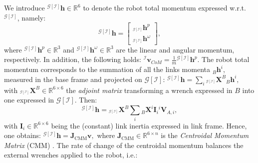 We introduce ${}^{\mathcal{G}[\mathcal{I}]} \boldsymbol{h} \in \mathbb{R}^6$ to denote the robot total momentum expressed w.r.t. ${}^{\mathcal{G}[\mathcal{I}]}$, namely:
\begin{equation}
	{}^{\mathcal{G}[\mathcal{I}]} \boldsymbol{h} = \begin{bmatrix}
		{}_{{}^{\mathcal{G}[\mathcal{I}]}} \boldsymbol{h}^p \\
		{}_{{}^{\mathcal{G}[\mathcal{I}]}} \boldsymbol{h}^\omega
	\end{bmatrix},
\end{equation}
where ${}^{\mathcal{G}[\mathcal{I}]} \boldsymbol{h}^p \in \mathbb{R}^3$ and ${}^{\mathcal{G}[\mathcal{I}]} \boldsymbol{h}^\omega \in \mathbb{R}^3$ are the linear and angular momentum, respectively. In addition, the following holds:
	${}^{\mathcal{I}}\boldsymbol{v}_{CoM}  = \frac{1}{m}{} {{}^{\mathcal{G}[\mathcal{I}]}} \boldsymbol{h}^p.$
The robot total momentum corresponds to the summation of all the links momenta ${}_B\boldsymbol{h}^i$, measured in the base frame and projected on ${\mathcal{G}[\mathcal{I}]}$:
	${}^{\mathcal{G}[\mathcal{I}]}\boldsymbol{h} = \sum_i {}_{{}^{\mathcal{G}[\mathcal{I}]}} \boldsymbol{X}^B {}_B\boldsymbol{h}^i,$
with ${}_{{}^{\mathcal{G}[\mathcal{I}]}} \boldsymbol{X}^B \in \mathbb{R}^{6\times6}$ the \emph{adjoint matrix}  transforming a wrench expressed in $B$ into one expressed in ${\mathcal{G}[\mathcal{I}]}$.
Then: 
\begin{equation}\label{eq:momentumExpanded}
	{}^{\mathcal{G}[\mathcal{I}]} \boldsymbol{h} = {}_{{}^{\mathcal{G}[\mathcal{I}]}} \boldsymbol{X}^B \sum_i {}_{B}\boldsymbol{X}^i \boldsymbol{I}_i {}^i \boldsymbol{V}_{A,i},
\end{equation}
with $\boldsymbol{I}_i \in \mathbb{R}^{6\times 6}$ being the (constant) link inertia expressed in link frame. Hence, one obtains:
	${}^{\mathcal{G}[\mathcal{I}]} \boldsymbol{h} = \boldsymbol{J}_\text{CMM}\boldsymbol{v},$
where $\boldsymbol{J}_\text{CMM} \in \mathbb{R}^{6\times n}$ is the \emph{Centroidal Momentum Matrix} (CMM) \cite{orin2008}.
The rate of change of the centroidal momentum balances the external wrenches applied to the robot, i.e.:
